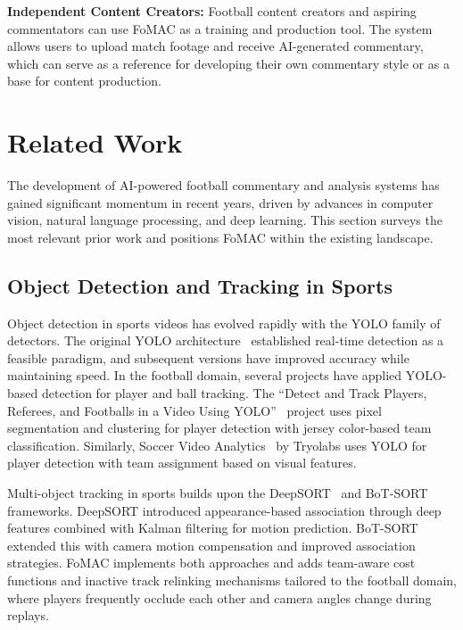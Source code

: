 \documentclass[10pt,twocolumn,a4paper]{article}
\begin{document}
\textbf{Independent Content Creators:} Football content creators and aspiring commentators can use FoMAC as a training and production tool. The system allows users to upload match footage and receive AI-generated commentary, which can serve as a reference for developing their own commentary style or as a base for content production.

\section{Related Work}

The development of AI-powered football commentary and analysis systems has gained significant momentum in recent years, driven by advances in computer vision, natural language processing, and deep learning. This section surveys the most relevant prior work and positions FoMAC within the existing landscape.

\subsection{Object Detection and Tracking in Sports}

Object detection in sports videos has evolved rapidly with the YOLO family of detectors. The original YOLO architecture~\cite{redmon2016yolo} established real-time detection as a feasible paradigm, and subsequent versions have improved accuracy while maintaining speed. In the football domain, several projects have applied YOLO-based detection for player and ball tracking. The ``Detect and Track Players, Referees, and Footballs in a Video Using YOLO''~\cite{football_yolo} project uses pixel segmentation and clustering for player detection with jersey color-based team classification. Similarly, Soccer Video Analytics~\cite{soccer_analytics} by Tryolabs uses YOLO for player detection with team assignment based on visual features.

Multi-object tracking in sports builds upon the DeepSORT~\cite{wojke2017deepsort} and BoT-SORT~\cite{zhang2022botsort} frameworks. DeepSORT introduced appearance-based association through deep features combined with Kalman filtering for motion prediction. BoT-SORT extended this with camera motion compensation and improved association strategies. FoMAC implements both approaches and adds team-aware cost functions and inactive track relinking mechanisms tailored to the football domain, where players frequently occlude each other and camera angles change during replays.
\end{document}
